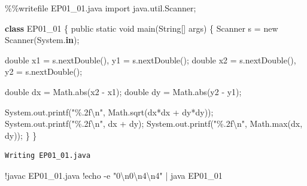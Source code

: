 \documentclass[
  portuguese,
  letterpaper,
  openany,
  oneside,
  12pt,
  a4paper]{book}
\newenvironment{Shaded}{\begin{snugshade}}{\end{snugshade}}
\newcommand{\BuiltInTok}[1]{\textcolor[rgb]{0.00,0.23,0.31}{#1}}
\newcommand{\CharTok}[1]{\textcolor[rgb]{0.13,0.47,0.30}{#1}}
\newcommand{\ImportTok}[1]{\textcolor[rgb]{0.00,0.46,0.62}{#1}}
\newcommand{\KeywordTok}[1]{\textcolor[rgb]{0.00,0.23,0.31}{\textbf{#1}}}
\newcommand{\NormalTok}[1]{\textcolor[rgb]{0.00,0.23,0.31}{#1}}
\newcommand{\OperatorTok}[1]{\textcolor[rgb]{0.37,0.37,0.37}{#1}}
\newcommand{\SpecialCharTok}[1]{\textcolor[rgb]{0.37,0.37,0.37}{#1}}
\newcommand{\StringTok}[1]{\textcolor[rgb]{0.13,0.47,0.30}{#1}}
\begin{document}
\begin{Shaded}
\begin{Highlighting}[]
\OperatorTok{\%\%}\NormalTok{writefile EP01\_01.java}
\ImportTok{import}\NormalTok{ java.util.Scanner}\OperatorTok{;}

\KeywordTok{class}\NormalTok{ EP01\_01 \{}
\NormalTok{    public static void main(String[] args) \{}
\NormalTok{        Scanner s }\OperatorTok{=}\NormalTok{ new Scanner(System.}\KeywordTok{in}\NormalTok{)}\OperatorTok{;}
        
\NormalTok{        double x1 }\OperatorTok{=}\NormalTok{ s.nextDouble(), y1 }\OperatorTok{=}\NormalTok{ s.nextDouble()}\OperatorTok{;}
\NormalTok{        double x2 }\OperatorTok{=}\NormalTok{ s.nextDouble(), y2 }\OperatorTok{=}\NormalTok{ s.nextDouble()}\OperatorTok{;}
        
\NormalTok{        double dx }\OperatorTok{=}\NormalTok{ Math.}\BuiltInTok{abs}\NormalTok{(x2 }\OperatorTok{{-}}\NormalTok{ x1)}\OperatorTok{;}
\NormalTok{        double dy }\OperatorTok{=}\NormalTok{ Math.}\BuiltInTok{abs}\NormalTok{(y2 }\OperatorTok{{-}}\NormalTok{ y1)}\OperatorTok{;}
        
\NormalTok{        System.out.printf(}\StringTok{"}\SpecialCharTok{\%.2f}\CharTok{\textbackslash{}n}\StringTok{"}\NormalTok{, Math.sqrt(dx}\OperatorTok{*}\NormalTok{dx }\OperatorTok{+}\NormalTok{ dy}\OperatorTok{*}\NormalTok{dy))}\OperatorTok{;}
\NormalTok{        System.out.printf(}\StringTok{"}\SpecialCharTok{\%.2f}\CharTok{\textbackslash{}n}\StringTok{"}\NormalTok{, dx }\OperatorTok{+}\NormalTok{ dy)}\OperatorTok{;}
\NormalTok{        System.out.printf(}\StringTok{"}\SpecialCharTok{\%.2f}\CharTok{\textbackslash{}n}\StringTok{"}\NormalTok{, Math.}\BuiltInTok{max}\NormalTok{(dx, dy))}\OperatorTok{;}
\NormalTok{    \}}
\NormalTok{\}}
\end{Highlighting}
\end{Shaded}

\begin{verbatim}
Writing EP01_01.java
\end{verbatim}

\begin{Shaded}
\begin{Highlighting}[]
\OperatorTok{!}\NormalTok{javac EP01\_01.java}
\OperatorTok{!}\NormalTok{echo }\OperatorTok{{-}}\NormalTok{e }\StringTok{"0}\CharTok{\textbackslash{}n}\StringTok{0}\CharTok{\textbackslash{}n}\StringTok{4}\CharTok{\textbackslash{}n}\StringTok{4"} \OperatorTok{|}\NormalTok{ java EP01\_01}
\end{Highlighting}
\end{Shaded}
\end{document}
